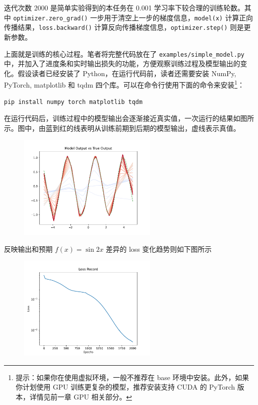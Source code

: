迭代次数 2000 是简单实验得到的本任务在 0.001 学习率下较合理的训练轮数。其中 \texttt{optimizer.zero\_grad()} 一步用于清空上一步的梯度信息，\texttt{model(x)} 计算正向传播结果，\texttt{loss.backward()} 计算反向传播梯度信息，\texttt{optimizer.step()} 则是更新参数。

上面就是训练的核心过程。笔者将完整代码放在了 \texttt{examples/simple\_model.py} 中，并加入了进度条和实时输出损失的功能，方便观察训练过程及模型输出的变化。假设读者已经安装了 Python，在运行代码前，读者还需要安装 NumPy, PyTorch, matplotlib 和 tqdm 四个库。可以在命令行使用下面的命令来安装\footnote{提示：如果你在使用虚拟环境，一般不推荐在 base 环境中安装。此外，如果你计划使用 GPU 训练更复杂的模型，推荐安装支持 CUDA 的 PyTorch 版本，详情见前一章 GPU 相关部分。}：
\begin{verbatim}
pip install numpy torch matplotlib tqdm
\end{verbatim}

在运行代码后，训练过程中的模型输出会逐渐接近真实值，一次运行的结果如图所示。图中，由蓝到红的线表明从训练前期到后期的模型输出，虚线表示真值。
\begin{figure}[H]
\centering
\includegraphics[width=0.6\textwidth]{img/simple_model_output.pdf}
\end{figure}

反映输出和预期 $f(x) = \sin 2x$ 差异的 loss 变化趋势则如下图所示
\begin{figure}[H]
\centering
\includegraphics[width=0.6\textwidth]{img/simple_model_loss.pdf}
\end{figure}

